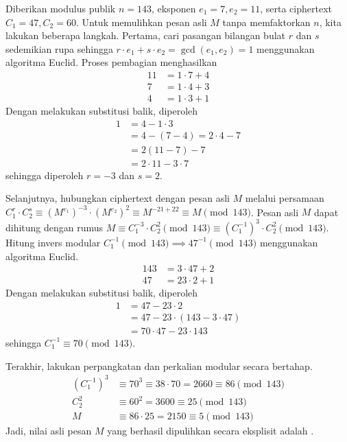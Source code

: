 \documentclass[12pt,a4paper]{article}
\begin{document}
Diberikan modulus publik $n = 143$, eksponen $e_1 = 7, e_2 = 11$, serta ciphertext $C_1 = 47, C_2 = 60$. Untuk memulihkan pesan asli $M$ tanpa memfaktorkan $n$, kita lakukan beberapa langkah. Pertama, cari pasangan bilangan bulat $r$ dan $s$ sedemikian rupa sehingga $r \cdot e_1 + s \cdot e_2 = \gcd(e_1, e_2) = 1$ menggunakan algoritma Euclid. Proses pembagian menghasilkan
\begin{align*}
    11 &= 1 \cdot 7 + 4 \\
    7 &= 1 \cdot 4 + 3 \\
    4 &= 1 \cdot 3 + 1
\end{align*}
Dengan melakukan substitusi balik, diperoleh
\begin{align*}
    1 &= 4 - 1 \cdot 3 \\
      &= 4 - (7 - 4) = 2 \cdot 4 - 7 \\
      &= 2(11 - 7) - 7 \\
      &= 2 \cdot 11 - 3 \cdot 7
\end{align*}
sehingga diperoleh $r = -3$ dan $s = 2$.

Selanjutnya, hubungkan ciphertext dengan pesan asli $M$ melalui persamaan $C_1^r \cdot C_2^s \equiv (M^{e_1})^{-3} \cdot (M^{e_2})^2 \equiv M^{-21 + 22} \equiv M \pmod{143}$. Pesan asli $M$ dapat dihitung dengan rumus $M \equiv C_1^{-3} \cdot C_2^2 \pmod{143} \equiv (C_1^{-1})^3 \cdot C_2^2 \pmod{143}$. Hitung invers modular $C_1^{-1} \pmod{143} \implies 47^{-1} \pmod{143}$ menggunakan algoritma Euclid.
\begin{align*}
    143 &= 3 \cdot 47 + 2 \\
    47 &= 23 \cdot 2 + 1
\end{align*}
Dengan melakukan substitusi balik, diperoleh
\begin{align*}
    1 &= 47 - 23 \cdot 2 \\
      &= 47 - 23 \cdot (143 - 3 \cdot 47) \\
      &= 70 \cdot 47 - 23 \cdot 143
\end{align*}
sehingga $C_1^{-1} \equiv 70 \pmod{143}$.

Terakhir, lakukan perpangkatan dan perkalian modular secara bertahap.
\begin{align*}
    (C_1^{-1})^3 &\equiv 70^3 \equiv 38 \cdot 70 = 2660 \equiv 86 \pmod{143} \\
    C_2^2 &\equiv 60^2 = 3600 \equiv 25 \pmod{143} \\
    M &\equiv 86 \cdot 25 = 2150 \equiv 5 \pmod{143}
\end{align*}
Jadi, nilai asli pesan $M$ yang berhasil dipulihkan secara eksplisit adalah .
\end{document}
